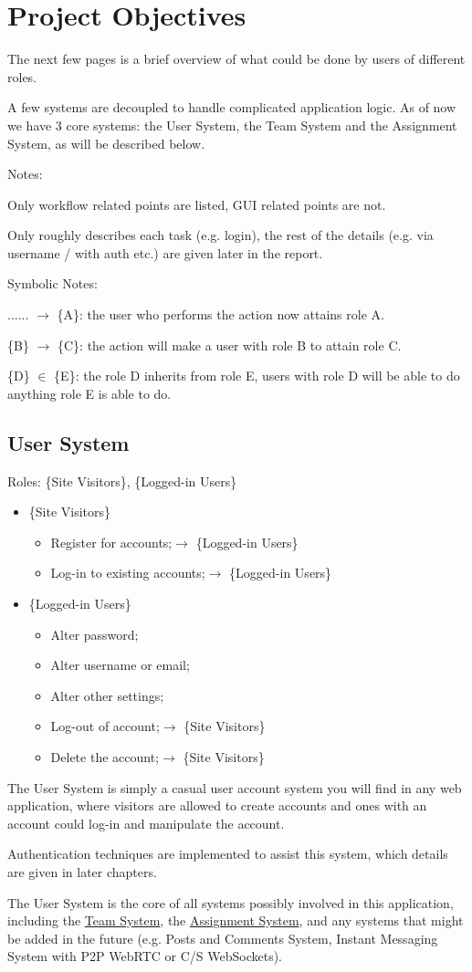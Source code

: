 \documentclass[12pt]{report}
\newcommand{\n}{\par}
\newcommand{\br}{\vspace{1 em}\n}
\begin{document}
\section{Project Objectives} \label{overview.project-objectives}
The next few pages is a brief overview of what could be done by users of different roles.\n
A few systems are decoupled to handle complicated application logic.
As of now we have 3 core systems: the User System, the Team System and the Assignment System,
as will be described below.
\br
Notes:\n
Only workflow related points are listed, GUI related points are not.\n
Only roughly describes each task (e.g. login),
the rest of the details (e.g. via username / with auth etc.) are given later in the report.
\br
Symbolic Notes:\n
...... $\rightarrow$ \{A\}: the user who performs the action now attains role A.\n
\{B\} $\rightarrow$ \{C\}: the action will make a user with role B to attain role C.\n
\{D\} $\in$ \{E\}: the role D inherits from role E, users with role D will be able to do anything role E is able to do.
\subsection{User System} \label{overview.project-objectives.user-system}
Roles: \{Site Visitors\}, \{Logged-in Users\}\n
\begin{itemize}
	\item \{Site Visitors\}
	      \begin{itemize}
		      \item Register for accounts;\null\hfill $\rightarrow$ \{Logged-in Users\}
		      \item Log-in to existing accounts;\null\hfill $\rightarrow$ \{Logged-in Users\}
	      \end{itemize}
	\item \{Logged-in Users\}
	      \begin{itemize}
		      \item Alter password;
		      \item Alter username or email;
		      \item Alter other settings;
		      \item Log-out of account;\null\hfill $\rightarrow$ \{Site Visitors\}
		      \item Delete the account;\null\hfill $\rightarrow$ \{Site Visitors\}
	      \end{itemize}
\end{itemize}\n
The User System is simply a casual user account system you will find in any web application,
where visitors are allowed to create accounts and ones with an account could log-in and manipulate the account.
\br
Authentication techniques are implemented to assist this system, which details are given in later chapters.
\br
The User System is the core of all systems possibly involved in this application,
including the \hyperref[overview.project-objectives.team-system]{Team System},
the \hyperref[overview.project-objectives.assignment-system]{Assignment System},
and any systems that might be added in the future (e.g. Posts and Comments System,
Instant Messaging System with P2P WebRTC or C/S WebSockets).
\end{document}

